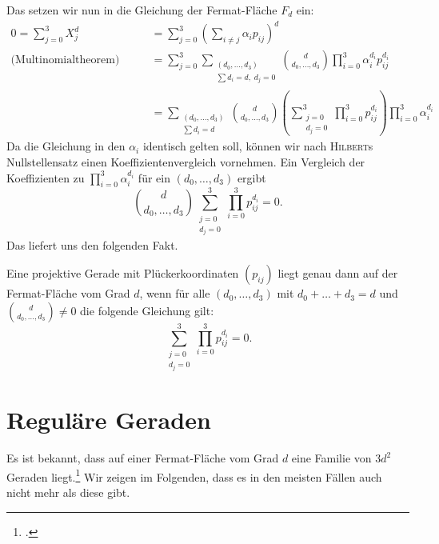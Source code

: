 Das setzen wir nun in die Gleichung der Fermat-Fläche $F_d$ ein:
\begin{align*}
0 = \sum_{j=0}^3 X_j^d &= \sum_{j=0}^3 \left(\sum_{i \neq j} \alpha_i p_{ij} \right)^d \\
\text{(Multinomialtheorem)}\qquad &= \sum_{j=0}^3 \sum_{\substack{(d_0,\dots,d_3) \\ \sum d_i=d,\;d_j=0}} \binom d{d_0,\dots,d_3} \prod_{i=0}^3 \alpha_i^{d_i} p_{ij}^{d_i} \\
	&= \sum_{\substack{(d_0,\dots,d_3) \\ \sum d_i=d}} \binom d{d_0,\dots,d_3} \left(\sum_{\substack{j=0 \\ d_j=0}}^3 \prod_{i=0}^3 p_{ij}^{d_i} \right) \prod_{i=0}^3 \alpha_i^{d_i}
\end{align*}
Da die Gleichung in den $\alpha_i$ identisch gelten soll, können wir nach \textsc{Hilbert}s Nullstellensatz einen Koeffizientenvergleich vornehmen. Ein Vergleich der Koeffizienten zu $\prod_{i=0}^3 \alpha_i^{d_i}$ für ein $(d_0,\dots,d_3)$ ergibt
\begin{equation}
\binom d{d_0,\dots,d_3} \sum_{\substack{j=0 \\ d_j=0}}^3 \prod_{i=0}^3 p_{ij}^{d_i} = 0.
\end{equation}
Das liefert uns den folgenden Fakt.

\begin{fact}
Eine projektive Gerade mit Plückerkoordinaten $(p_{ij})$ liegt genau dann auf der Fermat-Fläche vom Grad $d$, wenn für alle $(d_0,\dots,d_3)$ mit $d_0 + \dots + d_3 = d$ und $\binom d{d_0,\dots,d_3} \neq 0$ die folgende Gleichung gilt:
\begin{equation}
\sum_{\substack{j=0 \\ d_j=0}}^3 \prod_{i=0}^3 p_{ij}^{d_i} = 0.
\end{equation}
\end{fact}

\section{Reguläre Geraden}
Es ist bekannt, dass auf einer Fermat-Fläche vom Grad $d$ eine Familie von $3d^2$ Geraden liegt.\footcite[siehe u.\,a.][S.~5]{LinesOnFermat} Wir zeigen im Folgenden, dass es in den meisten Fällen auch nicht mehr als diese gibt.

